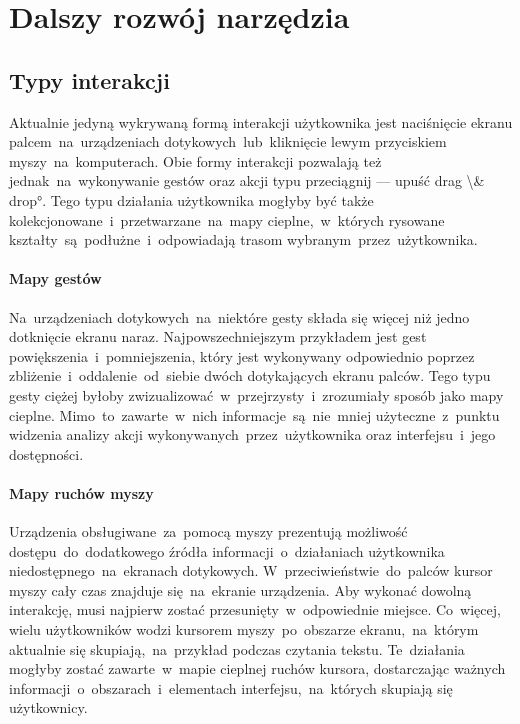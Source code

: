 \section{Dalszy rozwój narzędzia}
\label{sec:future_work}

\subsection{Typy interakcji}
Aktualnie jedyną wykrywaną formą interakcji użytkownika jest naciśnięcie ekranu palcem~na~urządzeniach dotykowych~lub~kliknięcie lewym przyciskiem myszy~na~komputerach. Obie formy interakcji pozwalają też jednak~na~wykonywanie gestów oraz akcji typu przeciągnij --- upuść \ang{drag \& drop}. Tego typu działania użytkownika mogłyby być także kolekcjonowane~i~przetwarzane~na~mapy cieplne,~w~których rysowane kształty~są~podłużne~i~odpowiadają trasom wybranym~przez~użytkownika.

\paragraph{Mapy gestów} Na~urządzeniach dotykowych~na~niektóre gesty składa się więcej niż jedno dotknięcie ekranu naraz. Najpowszechniejszym przykładem jest gest powiększenia~i~pomniejszenia, który jest wykonywany odpowiednio poprzez zbliżenie~i~oddalenie~od~siebie dwóch dotykających ekranu palców. Tego typu gesty ciężej byłoby zwizualizować~w~przejrzysty~i~zrozumiały sposób jako mapy cieplne. Mimo~to~zawarte~w~nich informacje~są~nie~mniej użyteczne~z~punktu widzenia analizy akcji wykonywanych~przez~użytkownika oraz interfejsu~i~jego dostępności.

\paragraph{Mapy ruchów myszy} Urządzenia obsługiwane~za~pomocą myszy prezentują możliwość dostępu~do~dodatkowego źródła informacji~o~działaniach użytkownika niedostępnego~na~ekranach dotykowych. W~przeciwieństwie~do~palców kursor myszy cały czas znajduje się~na~ekranie urządzenia. Aby wykonać dowolną interakcję, musi najpierw zostać przesunięty~w~odpowiednie miejsce. Co~więcej, wielu użytkowników wodzi kursorem myszy~po~obszarze ekranu,~na~którym aktualnie się skupiają,~na~przykład podczas czytania tekstu. Te~działania mogłyby zostać zawarte~w~mapie cieplnej ruchów kursora, dostarczając ważnych informacji~o~obszarach~i~elementach interfejsu,~na~których skupiają się użytkownicy.

